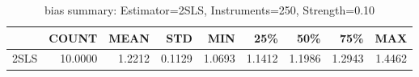 \begin{table}[ht]
\centering
\caption{bias summary: Estimator=2SLS, Instruments=250, Strength=0.10}
\begin{tabular}{lrrrrrrrr}
\toprule
 & COUNT & MEAN & STD & MIN & 25\% & 50\% & 75\% & MAX \\
\midrule
2SLS & 10.0000 & 1.2212 & 0.1129 & 1.0693 & 1.1412 & 1.1986 & 1.2943 & 1.4462 \\
\bottomrule
\end{tabular}
\end{table}
